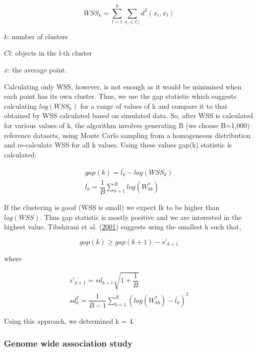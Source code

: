 \documentclass[12pt,twoside]{unicam}
\begin{document}
\begin{equation}
    WSS_k = \sum_{l=1}^{k}{\sum_{x_i\in C_l}{d^2(x_i,\overline{x_l})}}
  \label{eq:disWSS}
\end{equation}

\(k\): number of clusters

\(Cl\): objects in the l-th cluster

\(\overline{x}\): the average point.

Calculating only WSS, however, is not enough as it would be minimised when each point has its own cluster. Thus, we use the gap statistic which suggests calculating \(log(WSS_k)\) for a range of values of k and compare it to that obtained by WSS calculated based on simulated data. So, after WSS is calculated for various values of k, the algorithm involves generating B (we choose B=1,000) reference datasets, using Monte Carlo sampling from a homogeneous distribution and re-calculate WSS for all k values. Using these values gap(k) statistic is calculated:

\begin{equation}
\begin{aligned}
    gap(k) = \overline{l_k}-log(WSS_k)\\\overline{l_k} =\dfrac{1}{B}\sum_{b=1}^{B}{log(W^*_{kb})}
  \label{eq:disgapstat}
\end{aligned}
\end{equation}

If the clustering is good (WSS is small) we expect lk to be higher than \(log(WSS)\). Thus gap statistic is mostly positive and we are interested in the highest value. Tibshirani et al. (\protect\hyperlink{ref-Tibshirani2001}{2001}) suggests using the smallest k such that,

\begin{equation}
    gap(k)≥gap(k+1)-s'_{k+1}
  \label{eq:disgapstatincrem}
\end{equation}

where

\begin{equation}
\begin{aligned}
    s'_{k+1}=sd_{k+1}\sqrt{1+\dfrac{1}{B}}\\
    sd^2_k=\dfrac{1}{B-1}\sum_{b=1}^{B}{(log(W^*_{kb})-\overline{l_k})^2}
  \label{eq:dissk}
\end{aligned}
\end{equation}

Using this approach, we determined k = 4.

\hypertarget{genome-wide-association-study}{%
\subsubsection{Genome wide association study}\label{genome-wide-association-study}}
\end{document}
